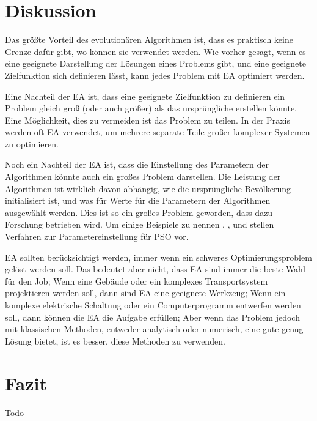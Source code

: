 \documentclass[twoside,twocolumn]{article}
\begin{document}

\section{Diskussion}
\lettrine[nindent=0em,lines=3]{D} as größte Vorteil des evolutionären Algorithmen ist, dass es praktisch keine Grenze dafür gibt, wo können sie verwendet werden. Wie vorher gesagt, wenn es eine geeignete Darstellung der Lösungen eines Problems gibt, und eine geeignete Zielfunktion sich definieren lässt, kann jedes Problem mit EA optimiert werden.\par
Eine Nachteil der EA ist, dass eine geeignete Zielfunktion zu definieren ein Problem gleich groß (oder auch größer) als das ursprüngliche erstellen könnte. Eine Möglichkeit, dies zu vermeiden ist das Problem zu teilen. In der Praxis werden oft EA verwendet, um mehrere separate Teile großer komplexer Systemen zu optimieren.\par
Noch ein Nachteil der EA ist, dass die Einstellung des Parametern der Algorithmen könnte auch ein großes Problem darstellen. Die Leistung der Algorithmen ist wirklich davon abhängig, wie die ursprüngliche Bevölkerung initialisiert ist, und was für Werte für die Parametern der Algorithmen ausgewählt werden. Dies ist so ein großes Problem geworden, dass dazu Forschung betrieben wird. Um einige Beispiele zu nennen \cite{pso_tuning_a}, \cite{pso_tuning_b}, und \cite{pso_tuning_c} stellen Verfahren zur Parametereinstellung für PSO vor.\par
EA sollten berücksichtigt werden, immer wenn ein schweres Optimierungsproblem gelöst werden soll. Das bedeutet aber nicht, dass EA sind immer die beste Wahl für den Job; Wenn eine Gebäude oder ein komplexes Transportsystem projektieren werden soll, dann sind EA eine geeignete Werkzeug; Wenn ein komplexe elektrische Schaltung oder ein Computerprogramm entwerfen werden soll, dann können die EA die Aufgabe erfüllen; Aber wenn das Problem jedoch mit klassischen Methoden, entweder analytisch oder numerisch, eine gute genug Lösung bietet, ist es besser, diese Methoden zu verwenden.


\section{Fazit}

Todo


\renewcommand{\refname}{Quellenverzeichnis}




\end{document}

